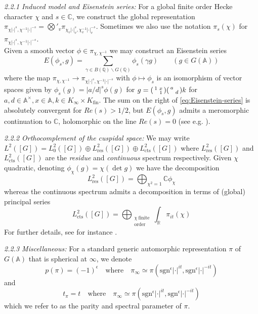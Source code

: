 \documentclass{article}
\numberwithin{equation}{section}
\begin{document}
\noindent \emph{2.2.1 Induced model and Eisenstein series:} For a global finite order Hecke character $\chi$  and $s \in \mathbb{C}$, we construct the global representation $\pi_{\chi|\cdot|^s, \chi^{-1}|\cdot|^{-s}}=\bigotimes'_v\pi_{\chi_v|\cdot|_v^{s},\chi_v^{-1}|\cdot|_v^{-s}}$.  Sometimes we also use the notation $\pi_{s}(\chi)$ for $\pi_{\chi|\cdot|^{s},\chi^{-1}|\cdot|^{-s}}$.\\
Given a smooth vector $\phi \in \pi_{\chi,\chi^{-1}}$ we may construct an Eisenstein series
\begin{equation}\label{eq:Eisenstein-series}
    E(\phi_s,g)=\sum_{\gamma \in B(\mathbb{Q})\backslash G(\mathbb{Q})}\phi_s(\gamma g) \qquad (g \in G(\mathbb{A}))
\end{equation}
where the map $\pi_{\chi,\chi^{-1}}\to \pi_{\chi|\cdot|^s,\chi^{-1}|\cdot|^{-s}} $ with $\phi\mapsto \phi_s$ is an isomorphism of vector spaces given by $\phi_s(g)=|a/d|^s\phi(g)$ for $g=\begin{psmallmatrix}
    1 & x \\ & 1
\end{psmallmatrix}\begin{psmallmatrix}
    a & \\ & d
\end{psmallmatrix}k$ for $a,d \in \mathbb{A}^\times, x \in \mathbb{A}, k \in K_\infty\times K_\text{fin}$.
The sum on the right of \eqref{eq:Eisenstein-series} is absolutely convergent for $Re(s)>1/2$, but $E(\phi_s,g)$ admits a meromorphic continuation to $\mathbb{C}$, holomorphic on the line $Re(s)=0$ (see e.g. \cite[\S 3.7]{Bump}). \bigbreak

\noindent \emph{2.2.2 Orthocomplement of the cuspidal space:} We may write $L^2([G])=L_0^2([G])\oplus L^2_\text{res}([G])\oplus L^2_\text{cts}([G])$ where $L^2_\text{res}([G])$ and $L^2_\text{cts}([G])$ are the \emph{residue} and \emph{continuous} spectrum respectively. Given $\chi$ quadratic, denoting $\phi_\chi(g)=\chi(\det g)$ we have the decomposition
$$L^2_\text{res}([G])=\bigoplus_{\chi^2=1}\mathbb{C}\phi_\chi$$
whereas the continuous spectrum admits a decomposition in terms of (global) principal series
$$L^2_\text{cts}([G])=\bigoplus_{\substack{\chi \ \text{finite}\\ \text{order}}}\int_{\mathbb{R}}\pi_{it}(\chi)$$
For further details, see for instance \cite[\S 4D]{Gelbart-Jacquet}. \bigbreak

\noindent \emph{2.2.3 Miscellaneous:} For a standard generic automorphic representation $\pi$ of $G(\mathbb{A})$ that is spherical at $\infty$, we denote
\begin{equation}\label{def:parity}
    p(\pi)=(-1)^\epsilon \quad \text{where} \quad \pi_\infty\simeq \pi(\text{sgn}^\epsilon|\cdot|^{it},\text{sgn}^\epsilon |\cdot|^{-it})
\end{equation}
and 
\begin{equation}\label{def:spectral parameter}
    t_\pi=t \quad \text{where} \quad \pi_\infty\simeq \pi(\text{sgn}^\epsilon|\cdot|^{it},\text{sgn}^\epsilon |\cdot|^{-it})
\end{equation}
which we refer to as the parity and spectral parameter of $\pi$. 
\end{document}
